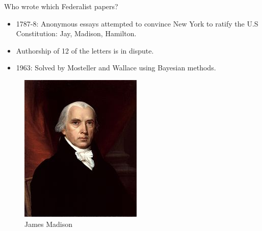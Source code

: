 \documentclass[handout]{beamer}
\begin{document}
\begin{frame}{Who wrote which Federalist papers?}
    \scriptsize
    \begin{itemize}
        \item 1787-8: Anonymous essays attempted to convince New York to ratify the U.S Constitution: Jay, Madison, Hamilton.
        \item Authorship of 12 of the letters is in dispute.
        \item 1963: Solved by Mosteller and Wallace using Bayesian methods.
    \end{itemize}
    \vspace{5pt}
    \begin{center}
        \begin{figure}[h]
            \begin{minipage}{0.3\textwidth}
                \centering
                \includegraphics[width=\linewidth]{pics/madison.png}
                \caption{James Madison}
            \end{minipage}\hfill
            \begin{minipage}{0.3\textwidth}

\end{minipage}
\end{figure}
\end{center}
\end{frame}
\end{document}
